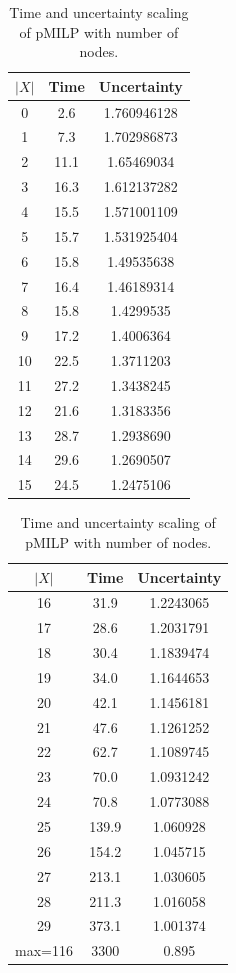 {\begin{table}[h!]
		\centering
		\hspace*{4ex}
		\begin{subtable}[b]{0.45\textwidth}
		\begin{tabular}{|c|c|c|}
		\hline
		$|X|$ & Time & Uncertainty\\ 
		\hline	0 & 2.6 & 1.760946128\\
		\hline	1 & 7.3 & 1.702986873\\
		\hline	2 & 11.1 & 1.65469034\\
		\hline	3 & 16.3 & 1.612137282\\
		\hline	4 & 15.5 & 1.571001109\\
		\hline	5 & 15.7 & 1.531925404\\
		\hline	6 & 15.8 & 1.49535638\\
		\hline	7 & 16.4 & 1.46189314\\
		\hline	8 &  15.8 & 1.4299535\\
		\hline	9 &  17.2 & 1.4006364\\
		\hline	10 & 22.5 & 1.3711203\\
		\hline	11 & 27.2 & 1.3438245\\
		\hline	12 & 21.6 & 1.3183356\\
		\hline	13 & 28.7 & 1.2938690\\
		\hline	14 & 29.6 & 1.2690507\\
		\hline	15 & 24.5 & 1.2475106\\
		\hline
	  \end{tabular}
	\end{subtable}
	\hfill
	\begin{subtable}[b]{0.45\textwidth}
		\begin{tabular}{|c|c|c|}
			\hline
			$|X|$ & Time & Uncertainty\\ 
		\hline	16 & 31.9 & 1.2243065\\
		\hline	17 & 28.6 & 1.2031791\\
		\hline	18 & 30.4 & 1.1839474\\
		\hline	19 & 34.0 & 1.1644653\\
		\hline	20 & 42.1 & 1.1456181\\
		\hline	21 & 47.6 & 1.1261252\\
		\hline	22 & 62.7 & 1.1089745\\
		\hline	23 & 70.0 & 1.0931242\\
		\hline	24 & 70.8 & 1.0773088\\
		\hline	25 & 139.9 & 1.060928\\
		\hline	26 & 154.2 & 1.045715\\
		\hline	27 & 213.1 & 1.030605 \\
		\hline	28 & 211.3 & 1.016058\\
		\hline	29 & 373.1 & 1.001374\\
		\hline max=116 & 3300 & 0.895\\ 
		\hline		
	  \end{tabular}
     \end{subtable}
	  \caption{Time and uncertainty scaling of pMILP with number of nodes.}
    	\label{table14}
\end{table}


}

